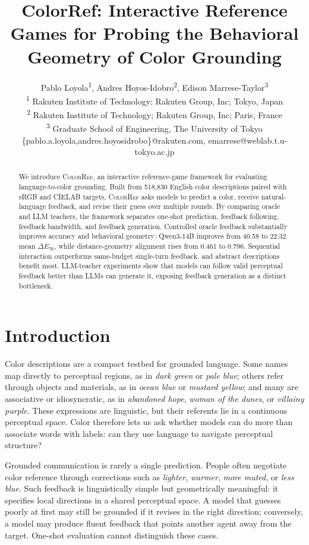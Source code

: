 \documentclass[11pt]{article}
\title{ColorRef: Interactive Reference Games for Probing the Behavioral Geometry of Color Grounding}
\author{Pablo Loyola\textsuperscript{1}, Andres Hoyos-Idobro\textsuperscript{2}, Edison Marrese-Taylor\textsuperscript{3} \\
    \textsuperscript{1} Rakuten Institute of Technology; Rakuten Group, Inc; Tokyo, Japan\\
    \textsuperscript{2} Rakuten Institute of Technology; Rakuten Group, Inc; Paris, France\\
    \textsuperscript{3} Graduate School of Engineering, The University of Tokyo\\
    \{pablo.a.loyola,andres.hoyosidrobo\}@rakuten.com, emarrese@weblab.t.u-tokyo.ac.jp
}
\begin{document}
\maketitle

\begin{abstract}
We introduce \textsc{ColorRef}, an interactive reference-game framework for
evaluating language-to-color grounding. Built from 518{,}830 English color
descriptions paired with sRGB and CIELAB targets, \textsc{ColorRef} asks
models to predict a color, receive natural-language feedback, and revise
their guess over multiple rounds. By comparing oracle and LLM teachers, the
framework separates one-shot prediction, feedback following, feedback
bandwidth, and feedback generation. Controlled oracle feedback substantially
improves accuracy and behavioral geometry: Qwen3-14B improves from 40.58 to
22.32 mean $\Delta E_{76}$, while distance-geometry alignment rises from
0.461 to 0.796. Sequential interaction outperforms same-budget single-turn
feedback, and abstract descriptions benefit most. LLM-teacher experiments
show that models can follow valid perceptual feedback better than LLMs can
generate it, exposing feedback generation as a distinct bottleneck.
\end{abstract}



\section{Introduction}
\label{sec:introduction}

Color descriptions are a compact testbed for grounded language. Some names
map directly to perceptual regions, as in \textit{dark green} or
\textit{pale blue}; others refer through objects and materials, as in
\textit{ocean blue} or \textit{mustard yellow}; and many are associative or
idiosyncratic, as in \textit{abandoned hope}, \textit{woman of the dunes},
or \textit{villainy purple}. These expressions are linguistic, but their
referents lie in a continuous perceptual space. Color therefore lets us ask
whether models can do more than associate words with labels: can they use
language to navigate perceptual structure?

Grounded communication is rarely a single prediction. People often negotiate
color reference through corrections such as \textit{lighter},
\textit{warmer}, \textit{more muted}, or \textit{less blue}. Such feedback is
linguistically simple but geometrically meaningful: it specifies local
directions in a shared perceptual space. A model that guesses poorly at first
may still be grounded if it revises in the right direction; conversely, a
model may produce fluent feedback that points another agent away from the
target. One-shot evaluation cannot distinguish these cases.
\end{document}
